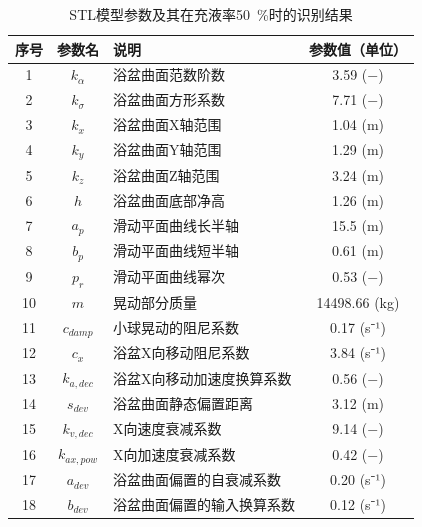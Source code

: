             \begin{table}[h]
            \centering
            \caption{STL模型参数及其在充液率\SI{50}{\percent}时的识别结果}
            \label{tab:stl_param}
            \begin{tabular}{cclc}
            \toprule
            序号 & 参数名 & 说明 & 参数值（单位） \\
            \midrule
            1 & $k_{\alpha}$ & 浴盆曲面范数阶数 & 3.59 ($-$) \\
            2 & $k_{\sigma}$ & 浴盆曲面方形系数 & 7.71 ($-$) \\
            3 & $k_x$ & 浴盆曲面X轴范围 & 1.04 (m) \\
            4 & $k_y$ & 浴盆曲面Y轴范围 & 1.29 (m) \\
            5 & $k_z$ & 浴盆曲面Z轴范围 & 3.24 (m) \\
            6 & $h$ & 浴盆曲面底部净高 & 1.26 (m) \\
            7 & $a_p$ & 滑动平面曲线长半轴 & 15.5 (m) \\
            8 & $b_p$ & 滑动平面曲线短半轴 & 0.61 (m) \\
            9 & $p_r$ & 滑动平面曲线幂次 & 0.53 ($-$) \\
            10 & $m$ & 晃动部分质量 & 14498.66 (kg) \\
            11 & $c_{damp}$ & 小球晃动的阻尼系数 & 0.17 (s⁻¹) \\
            12 & $c_x$ & 浴盆X向移动阻尼系数 & 3.84 (s⁻¹) \\
            13 & $k_{a,dec}$ & 浴盆X向移动加速度换算系数 & 0.56 ($-$) \\
            14 & $s_{dev}$ & 浴盆曲面静态偏置距离 & 3.12 (m) \\
            15 & $k_{v,dec}$ & X向速度衰减系数 & 9.14 ($-$) \\
            16 & $k_{ax,pow}$ & X向加速度衰减系数 & 0.42 ($-$) \\
            17 & $a_{dev}$ & 浴盆曲面偏置的自衰减系数 & 0.20 (s⁻¹) \\
            18 & $b_{dev}$ & 浴盆曲面偏置的输入换算系数 & 0.12 (s⁻¹) \\
            \bottomrule
            \end{tabular}
            \end{table}


            

